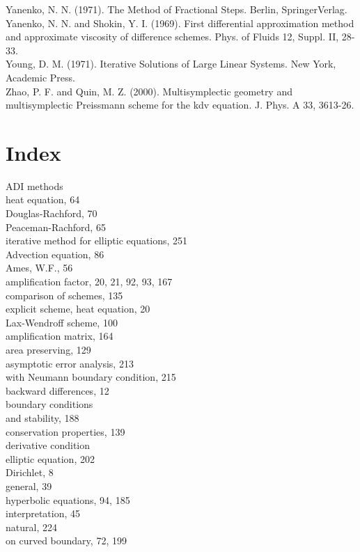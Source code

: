 \documentclass[10pt]{article}
\begin{document}
Yanenko, N. N. (1971). The Method of Fractional Steps. Berlin, SpringerVerlag.\\
Yanenko, N. N. and Shokin, Y. I. (1969). First differential approximation method and approximate viscosity of difference schemes. Phys. of Fluids 12, Suppl. II, 28-33.\\
Young, D. M. (1971). Iterative Solutions of Large Linear Systems. New York, Academic Press.\\
Zhao, P. F. and Quin, M. Z. (2000). Multisymplectic geometry and multisymplectic Preissmann scheme for the kdv equation. J. Phys. A 33, 3613-26.

\section*{Index}
ADI methods\\
heat equation, 64\\
Douglas-Rachford, 70\\
Peaceman-Rachford, 65\\
iterative method for elliptic equations, 251\\
Advection equation, 86\\
Ames, W.F., 56\\
amplification factor, 20, 21, 92, 93, 167\\
comparison of schemes, 135\\
explicit scheme, heat equation, 20\\
Lax-Wendroff scheme, 100\\
amplification matrix, 164\\
area preserving, 129\\
asymptotic error analysis, 213\\
with Neumann boundary condition, 215\\
backward differences, 12\\
boundary conditions\\
and stability, 188\\
conservation properties, 139\\
derivative condition\\
elliptic equation, 202\\
Dirichlet, 8\\
general, 39\\
hyperbolic equations, 94, 185\\
interpretation, 45\\
natural, 224\\
on curved boundary, 72, 199\\
\end{document}
